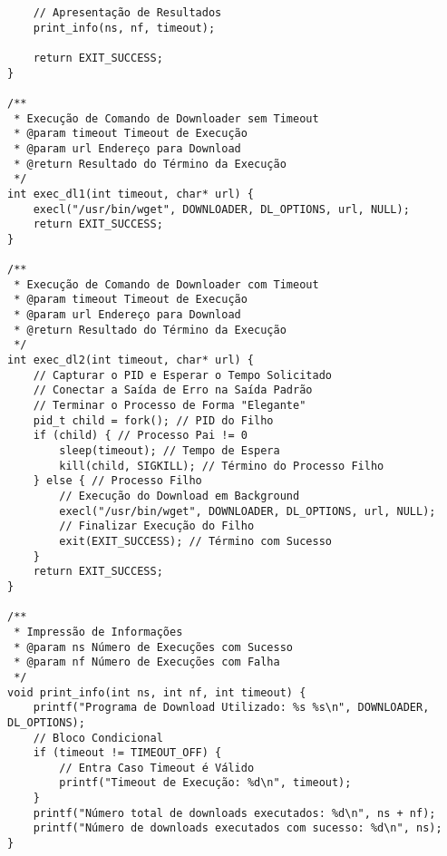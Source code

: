 \documentclass{article}
\begin{document}
\begin{small}
\begin{verbatim}
    // Apresentação de Resultados
    print_info(ns, nf, timeout);

    return EXIT_SUCCESS;
}

/**
 * Execução de Comando de Downloader sem Timeout
 * @param timeout Timeout de Execução
 * @param url Endereço para Download
 * @return Resultado do Término da Execução
 */
int exec_dl1(int timeout, char* url) {
    execl("/usr/bin/wget", DOWNLOADER, DL_OPTIONS, url, NULL);
    return EXIT_SUCCESS;
}

/**
 * Execução de Comando de Downloader com Timeout
 * @param timeout Timeout de Execução
 * @param url Endereço para Download
 * @return Resultado do Término da Execução
 */
int exec_dl2(int timeout, char* url) {
    // Capturar o PID e Esperar o Tempo Solicitado
    // Conectar a Saída de Erro na Saída Padrão
    // Terminar o Processo de Forma "Elegante"
    pid_t child = fork(); // PID do Filho
    if (child) { // Processo Pai != 0
        sleep(timeout); // Tempo de Espera
        kill(child, SIGKILL); // Término do Processo Filho
    } else { // Processo Filho
        // Execução do Download em Background
        execl("/usr/bin/wget", DOWNLOADER, DL_OPTIONS, url, NULL);
        // Finalizar Execução do Filho
        exit(EXIT_SUCCESS); // Término com Sucesso
    }
    return EXIT_SUCCESS;
}

/**
 * Impressão de Informações
 * @param ns Número de Execuções com Sucesso
 * @param nf Número de Execuções com Falha
 */
void print_info(int ns, int nf, int timeout) {
    printf("Programa de Download Utilizado: %s %s\n", DOWNLOADER, DL_OPTIONS);
    // Bloco Condicional
    if (timeout != TIMEOUT_OFF) {
        // Entra Caso Timeout é Válido
        printf("Timeout de Execução: %d\n", timeout);
    }
    printf("Número total de downloads executados: %d\n", ns + nf);
    printf("Número de downloads executados com sucesso: %d\n", ns);
}

\end{verbatim}
\end{small}
\end{document}
